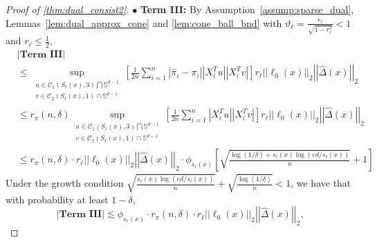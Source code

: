 \documentclass[ejsv2,noshowframe]{imsart}
\theoremstyle{plain}
\theoremstyle{definition}
\theoremstyle{remark}
\newcommand{\norm}[1]{\left|\left| #1 \right|\right|}
\renewcommand{\hat}{\widehat}
\begin{document}
\begin{proof}[Proof of \autoref{thm:dual_consist2}]
	$\bullet$ {\bf Term III:} By Assumption~\ref{assump:sparse_dual}, Lemmas~\ref{lem:dual_approx_cone} and \ref{lem:cone_ball_bnd} with $\vartheta_{\ell}=\frac{r_{\ell}}{\sqrt{1-r_{\ell}^2}} < 1$ and $r_{\ell} \leq \frac{1}{2}$, 
	\begin{align*}
		&\left|\textbf{Term III}\right| \\
		&\leq \sup_{\substack{u \in \mathcal{C}_1(S_{\ell}(x),3) \bigcap \mathbb{S}^{d-1}\\v\in \mathcal{C}_2(S_{\ell}(x), 1) \cap \mathbb{S}^{d-1}}} \left[\frac{1}{2n} \sum_{i=1}^n \left|\hat{\pi}_i - \pi_i\right| \left|X_i^Tu \right| |X_i^Tv| \right] r_{\ell} \norm{\ell_0(x)}_2 \norm{\hat{\Delta}(x)}_2\\
		&\leq r_{\pi}(n,\delta) \sup_{\substack{u \in \mathcal{C}_1(S_{\ell}(x),3) \bigcap \mathbb{S}^{d-1}\\v\in \mathcal{C}_2(S_{\ell}(x), 1) \cap \mathbb{S}^{d-1}}} \left[\frac{1}{2n} \sum_{i=1}^n \left|X_i^Tu \right| |X_i^Tv| \right] r_{\ell} \norm{\ell_0(x)}_2 \norm{\hat{\Delta}(x)}_2\\
		&\leq r_{\pi}(n,\delta) \cdot r_{\ell} \norm{\ell_0(x)}_2 \norm{\hat{\Delta}(x)}_2 \cdot \phi_{s_{\ell}(x)} \left[\sqrt{\frac{\log(1/\delta) + s_{\ell}(x)\log(ed/s_{\ell}(x))}{n}} + 1 \right]
	\end{align*}
	Under the growth condition $\sqrt{\frac{s_{\ell}(x)\log(ed/s_{\ell}(x))}{n}} + \sqrt{\frac{\log(1/\delta)}{n}} < 1$, we have that with probability at least $1-\delta$, 
	$$\left|\textbf{Term III}\right| \lesssim \phi_{s_{\ell}(x)} \cdot r_{\pi}(n,\delta) \cdot r_{\ell} \norm{\ell_0(x)}_2 \norm{\hat{\Delta}(x)}_2.$$
	

\end{proof}
\end{document}
